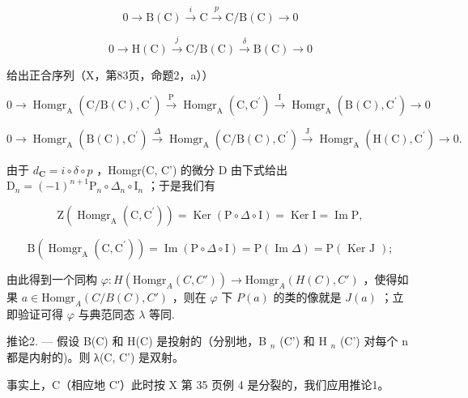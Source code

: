 \[
0 \rightarrow \mathrm{B} (\mathrm{C}) \xrightarrow {i} \mathrm{C} \xrightarrow {p} \mathrm{C} / \mathrm{B} (\mathrm{C}) \rightarrow 0\tag{III}
\]

\[
0 \rightarrow \mathrm{H} (\mathrm{C}) \stackrel {{j}} {{\rightarrow}} \mathrm{C} / \mathrm{B} (\mathrm{C}) \stackrel {{\delta}} {{\rightarrow}} \mathrm{B} (\mathrm{C}) \rightarrow 0\tag{IV}
\]

给出正合序列（X，第83页，命题2，a））

\[
0 \rightarrow \operatorname{Homgr} _ {\mathrm{A}} (\mathrm{C} / \mathrm{B} (\mathrm{C}), \mathrm{C} ^ {\prime}) \xrightarrow {\mathrm{P}} \operatorname{Homgr} _ {\mathrm{A}} (\mathrm{C}, \mathrm{C} ^ {\prime}) \xrightarrow {\mathrm{I}} \operatorname{Homgr} _ {\mathrm{A}} (\mathrm{B} (\mathrm{C}), \mathrm{C} ^ {\prime}) \rightarrow 0
\]

\[
0 \rightarrow \operatorname{Homgr} _ {\mathrm{A}} (\mathrm{B} (\mathrm{C}), \mathrm{C} ^ {\prime}) \stackrel {{\Delta}} {{\rightarrow}} \operatorname{Homgr} _ {\mathrm{A}} (\mathrm{C} / \mathrm{B} (\mathrm{C}), \mathrm{C} ^ {\prime}) \stackrel {{\mathrm{J}}} {{\rightarrow}} \operatorname{Homgr} _ {\mathrm{A}} (\mathrm{H} (\mathrm{C}), \mathrm{C} ^ {\prime}) \rightarrow 0.
\]

由于 \(d_{\mathbf{C}} = i \circ \delta \circ p\) ，Homgr(C, C') 的微分 D 由下式给出 \(\mathrm{D}_{n} = (-1)^{n+1} \mathrm{P}_{n} \circ \Delta_{n} \circ \mathrm{I}_{n}\) ；于是我们有

\[
\mathrm{Z} \left(\operatorname{Homgr} _ {\mathrm{A}} \left(\mathrm{C}, \mathrm{C} ^ {\prime}\right)\right) = \operatorname{Ker} (\mathrm{P} \circ \Delta \circ \mathrm{I}) = \operatorname{Ker} \mathrm{I} = \operatorname{Im} \mathrm{P},
\]

\[
\mathrm{B} \left(\operatorname{Homgr} _ {\mathrm{A}} \left(\mathrm{C}, \mathrm{C} ^ {\prime}\right)\right) = \operatorname{Im} (\mathrm{P} \circ \Delta \circ \mathrm{I}) = \mathrm{P} (\operatorname{Im} \Delta) = \mathrm{P} (\text { Ker   J });
\]

由此得到一个同构 \(\varphi : H(\text{Homgr}_A(C, C')) \to \text{Homgr}_A(H(C), C')\) ，使得如果 \(a \in \text{Homgr}_A(C/B(C), C')\) ，则在 \(\varphi\) 下 \(P(a)\) 的类的像就是 \(J(a)\) ；立即验证可得 \(\varphi\) 与典范同态 \(\lambda\) 等同.

推论2. --- 假设 B(C) 和 H(C) 是投射的（分别地，B \(_{n}\) (C') 和 H \(_{n}\) (C') 对每个 n 都是内射的)。则 λ(C, C') 是双射。

事实上，C（相应地 C′）此时按 X 第 35 页例 4 是分裂的，我们应用推论1。

